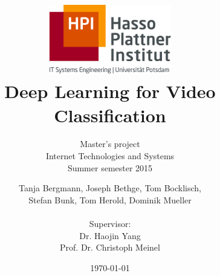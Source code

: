 \documentclass[a4paper,12pt,headsepline,pagesize,bibtotoc,titlepage]{scrartcl}
\title{
	\includegraphics*[width=0.4\textwidth]{images/hpi_logo.png}\\
	\vspace{24pt}
	Deep Learning for Video Classification
}
\subtitle{
	Master’s project\\
	Internet Technologies and Systems\\
	Summer semester 2015
}
\author{
	Tanja Bergmann, Joseph Bethge, Tom Bocklisch, \\
	Stefan Bunk, Tom Herold, Dominik Mueller \\ \\[12pt]
	Supervisor:\\
	Dr. Haojin Yang\\
	Prof. Dr. Christoph Meinel
}
\date{\today}
\begin{document}
\maketitle
\tableofcontents
\newpage














\newpage
{}

\end{document}
